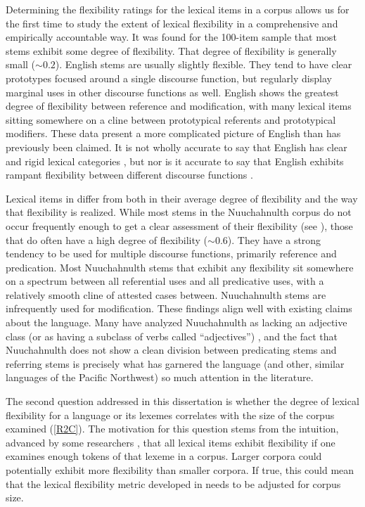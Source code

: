 Determining the flexibility ratings for the lexical items in a corpus allows us for the first time to study the extent of lexical flexibility in a comprehensive and empirically accountable way. It was found for the 100-item  sample that most stems exhibit some degree of flexibility. That degree of flexibility is generally small ($\sim0.2$). English stems are usually slightly flexible. They tend to have clear prototypes focused around a single discourse function, but regularly display marginal uses in other discourse functions as well. English shows the greatest degree of flexibility between reference and modification, with many lexical items sitting somewhere on a cline between prototypical referents and prototypical modifiers. These data present a more complicated picture of English than has previously been claimed. It is not wholly accurate to say that English has clear and rigid lexical categories \parencites[710]{Rijkhoff2007}[4, 11, 12]{SchachterShopen2007}[122, 126]{Velupillai2012}, but nor is it accurate to say that English exhibits rampant flexibility between different discourse functions \parencites[47--48]{Crystal1967}{Vonen1994}[75--76]{Croft2000}[69]{Croft2001b}{Farrell2001}{Cannon1985}.

Lexical items in  differ from  both in their average degree of flexibility and the way that flexibility is realized. While most stems in the Nuuchahnulth corpus do not occur frequently enough to get a clear assessment of their flexibility (see ), those that do often have a high degree of flexibility ($\sim0.6$). They have a strong tendency to be used for multiple discourse functions, primarily reference and predication. Most Nuuchahnulth stems that exhibit any flexibility sit somewhere on a spectrum between all referential uses and all predicative uses, with a relatively smooth cline of attested cases between. Nuuchahnulth stems are infrequently used for modification. These findings align well with existing claims about the language. Many have analyzed Nuuchahnulth as lacking an adjective class (or as having a subclass of verbs called \enquote{adjectives}) \parencites{Swadesh1939b}{Jacobsen1979}{Nakayama2001}, and the fact that Nuuchahnulth does not show a clean division between predicating stems and referring stems is precisely what has garnered the language (and other, similar languages of the Pacific Northwest) so much attention in the literature.

The second question addressed in this dissertation is whether the degree of lexical flexibility for a language or its lexemes correlates with the size of the corpus examined (\ref{R2C}). The motivation for this question stems from the intuition, advanced by some researchers \parencite{MoselHovdhaugen1992}, that all lexical items exhibit flexibility if one examines enough tokens of that lexeme in a corpus. Larger corpora could potentially exhibit more flexibility than smaller corpora. If true, this could mean that the lexical flexibility metric developed in  needs to be adjusted for corpus size.

